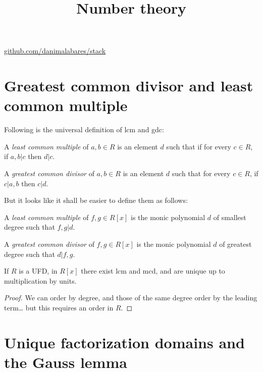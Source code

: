 



\title{Number theory}
\maketitle

\label{section-phantom}
\hfill
\href{http://github.com/danimalabares/stack}{github.com/danimalabares/stack}

\tableofcontents

\section{Greatest common divisor and least common multiple}
\label{section-gcd-and-lcm}

Following is the universal definition of lcm and gdc:

\begin{definition}
\label{definition-lcm-and-gdc-universal}
A {\it least common multiple} of $a,b \in R$ is an element $d$ such that if for
every $c\in R$, if $a,b|c$ then $d|c$.

A {\it greatest common divisor} of $a,b \in R$ is an element $d$ such that
for every  $c \in R$,  if $c|a,b$ then  $c|d$.
\end{definition}

But it looks like it shall be easier to define them
as follows:

\begin{definition}
\label{definition-lcm-and-gdc-polynomial}
A {\it least common multiple} of $f,g \in R[x]$ is the monic polynomial $d$ of
smallest degree such that $f,g|d$.

A {\it greatest common divisor} of $f,g\in R[x]$ is the monic polynomial $d$ of
greatest degree such that $d|f,g$.
\end{definition}

\begin{lemma}
\label{lemma-existence-of-lcm-and-gcd}
If $R$ is a UFD, in $R[x]$ there exist lcm and mcd, and are unique up to 
multiplication by units.
\end{lemma}

\begin{proof}
We can order by degree, and those of the same degree order by the leading
term… but this requires an order in $R$.
\end{proof}

\section{Unique factorization domains and the Gauss lemma}
\label{section-UFD}

